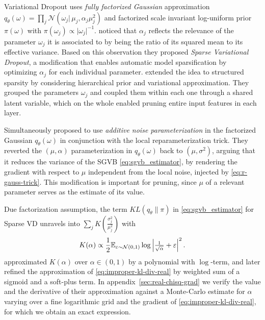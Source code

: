 \documentclass[a4paper,10pt,twocolumn]{article}
\begin{document}
Variational Dropout uses \emph{fully factorized Gaussian} approximation $
  q_\theta(\omega)
    = \prod_j \mathcal{N}(\omega_j \vert\, \mu_j, \alpha_j \mu_j^2)
$ and factorized scale invariant log-uniform prior $\pi(\omega)$ with $
  \pi(\omega_j) \propto \lvert \omega_j \rvert^{-1}
$. \citet{molchanov_variational_2017} noticed that $\alpha_j$ reflects the relevance of the
parameter $\omega_j$ it is associated to by being the ratio of its squared mean to its
effective variance. Based on this observation they proposed \emph{Sparse Variational Dropout},
a modification that enables automatic model sparsification by optimizing $\alpha_j$ for each
individual parameter. \citet{louizos_bayesian_2017} extended the idea to structured sparsity
by considering hierarchical prior and variational approximation. They grouped the parameters
$\omega_j$ and coupled them within each one through a shared latent variable, which on the
whole enabled pruning entire input features in each layer.

Simultaneously \citet{molchanov_variational_2017} proposed to use \emph{additive noise
parameterization} in the factorized Gaussian $q_\theta(\omega)$ in conjunction with the
local reparameterization trick. They reverted the $(\mu, \alpha)$ parameterization in
$q_\theta(\omega)$ back to $(\mu, \sigma^2)$, arguing that it reduces the variance of the
SGVB \eqref{eq:sgvb_estimator}, by rendering the gradient with respect to $\mu$ independent
from the local noise, injected by \eqref{eq:r-gauss-trick}. This modification is important
for pruning, since $\mu$ of a relevant parameter serves as the estimate of its value.

Due factorization assumption, the term $KL(q_\theta \| \pi)$ in \eqref{eq:sgvb_estimator}
for Sparse VD unravels into $
  \sum_j K(\tfrac{\sigma^2_{j}}{\mu_{j}^2})
$ with
\begin{equation}  \label{eq:improper-kl-div-real}
  K(\alpha)
    \propto \frac12 \mathbb{E}_{\varepsilon \sim \mathcal{N}(0, 1)}
        \log{\Bigl\lvert \tfrac1{\sqrt{\alpha}} + \varepsilon \Bigr\rvert^2}
  \,.
\end{equation}
\citet{kingma_variational_2015} approximated $K(\alpha)$ over $\alpha \in (0, 1)$ by
a polynomial with $\log$-term, and later \citet{molchanov_variational_2017} refined the
approximation of \eqref{eq:improper-kl-div-real} by weighted sum of a sigmoid and a
soft-plus term.
In appendix~\ref{sec:real-chisq-grad} we verify the value and the derivative of their
approximation against a Monte-Carlo estimate for
$\alpha$ varying over a fine logarithmic grid and the gradient of \eqref{eq:improper-kl-div-real},
for which we obtain an exact expression.
\end{document}
